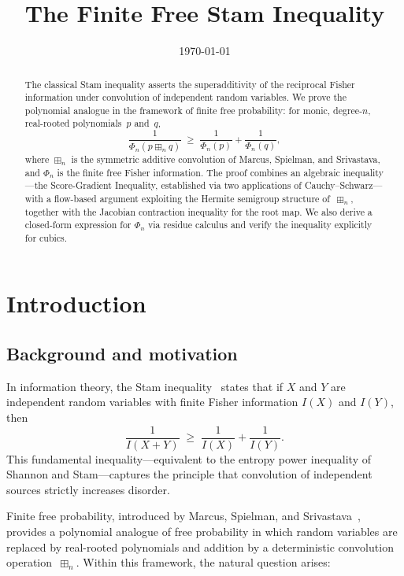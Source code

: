 \documentclass[11pt,a4paper]{amsart}
\theoremstyle{plain}
\theoremstyle{definition}
\theoremstyle{remark}
\newcommand{\fp}{\boxplus_n}
\begin{document}
\title{The Finite Free Stam Inequality}

\date{\today}

\begin{abstract}
The classical Stam inequality asserts the superadditivity of
the reciprocal Fisher information under convolution of
independent random variables.
We prove the polynomial analogue in the framework of finite
free probability: for monic, degree-$n$, real-rooted
polynomials~$p$ and~$q$,
\[
  \frac{1}{\Phi_n(p\fp q)}
  \;\ge\;
  \frac{1}{\Phi_n(p)}+\frac{1}{\Phi_n(q)},
\]
where $\fp$ is the symmetric additive convolution of Marcus,
Spielman, and Srivastava, and $\Phi_n$ is the finite free
Fisher information.
The proof combines an algebraic inequality---the
Score-Gradient Inequality, established via two applications
of Cauchy--Schwarz---with a flow-based argument exploiting
the Hermite semigroup structure of~$\fp$, together with
the Jacobian contraction inequality for the root map.
We also derive a closed-form expression for $\Phi_n$ via
residue calculus and verify the inequality explicitly for
cubics.
\end{abstract}

\maketitle
\tableofcontents

\section{Introduction}

\subsection{Background and motivation}

In information theory, the Stam inequality~\cite{stam}
states that if $X$ and $Y$ are independent random variables
with finite Fisher information $I(X)$ and $I(Y)$, then
\[
  \frac{1}{I(X+Y)}
  \;\ge\;\frac{1}{I(X)}+\frac{1}{I(Y)}.
\]
This fundamental inequality---equivalent to the entropy power
inequality of Shannon and Stam---captures the principle that
convolution of independent sources strictly increases disorder.

Finite free probability, introduced by Marcus, Spielman,
and Srivastava~\cite{MSS}, provides a polynomial analogue
of free probability in which random variables are replaced
by real-rooted polynomials and addition by a
deterministic convolution operation~$\fp$.
Within this framework, the natural question arises:
\end{document}
